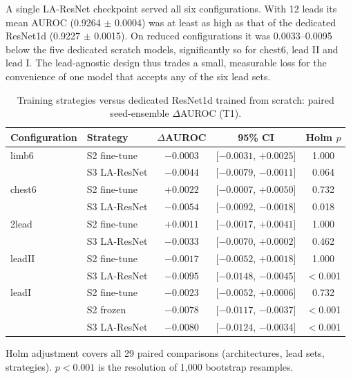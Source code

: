 A single LA-ResNet checkpoint served all six configurations. With 12 leads its mean AUROC (0.9264 $\pm$ 0.0004) was at least as high as that of the dedicated ResNet1d (0.9227 $\pm$ 0.0015). On reduced configurations it was 0.0033--0.0095 below the five dedicated scratch models, significantly so for chest6, lead II and lead I. The lead-agnostic design thus trades a small, measurable loss for the convenience of one model that accepts any of the six lead sets.

\begin{table}[t]
\centering
\small
\begin{threeparttable}
\caption{Training strategies versus dedicated ResNet1d trained from scratch: paired seed-ensemble $\Delta$AUROC (T1).}
\label{tab:strategies}
\begin{tabular}{llccc}
\toprule
Configuration & Strategy & $\Delta$AUROC & 95\% CI & Holm $p$ \\
\midrule
limb6 & S2 fine-tune & $-0.0003$ & [$-0.0031$, $+0.0025$] & 1.000 \\
 & S3 LA-ResNet & $-0.0044$ & [$-0.0079$, $-0.0011$] & 0.064 \\
chest6 & S2 fine-tune & $+0.0022$ & [$-0.0007$, $+0.0050$] & 0.732 \\
 & S3 LA-ResNet & $-0.0054$ & [$-0.0092$, $-0.0018$] & 0.018 \\
2lead & S2 fine-tune & $+0.0011$ & [$-0.0017$, $+0.0041$] & 1.000 \\
 & S3 LA-ResNet & $-0.0033$ & [$-0.0070$, $+0.0002$] & 0.462 \\
leadII & S2 fine-tune & $-0.0017$ & [$-0.0052$, $+0.0018$] & 1.000 \\
 & S3 LA-ResNet & $-0.0095$ & [$-0.0148$, $-0.0045$] & $<$0.001 \\
leadI & S2 fine-tune & $-0.0023$ & [$-0.0052$, $+0.0006$] & 0.732 \\
 & S2 frozen & $-0.0078$ & [$-0.0117$, $-0.0037$] & $<$0.001 \\
 & S3 LA-ResNet & $-0.0080$ & [$-0.0124$, $-0.0034$] & $<$0.001 \\
\bottomrule
\end{tabular}
\begin{tablenotes}\footnotesize
\item Holm adjustment covers all 29 paired comparisons (architectures, lead sets, strategies). $p<0.001$ is the resolution of 1,000 bootstrap resamples.
\end{tablenotes}
\end{threeparttable}
\end{table}

